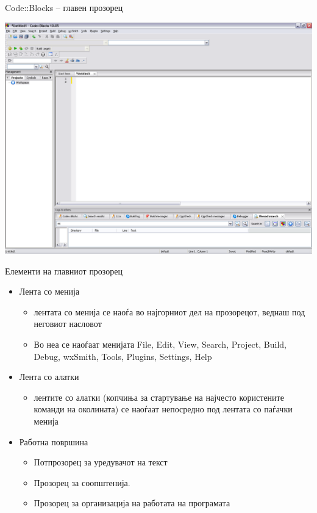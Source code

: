 \begin{frame}{Code::Blocks – главен прозорец}
\begin{center}
\includegraphics[scale=0.26]{images/cb_main}
\end{center}
\end{frame}

\begin{frame}{Елементи на главниот прозорец}
\begin{itemize}
  \item Лента со менија
    \begin{itemize}
      \item лентата со менија се наоѓа во најгорниот дел на прозорецот, веднаш под неговиот насловот 
      \item Во неа се наоѓаат менијата File, Edit, View, Search, Project, Build,
      Debug, wxSmith, Tools, Plugins, Settings, Help
    \end{itemize}
    \item Лента со алатки
    \begin{itemize}
      \item лентите со алатки (копчиња за стартување на најчесто користените
      команди на околината) се наоѓаат непосредно под лентата со паѓачки менија
    \end{itemize}
    \item Работна површина
    \begin{itemize}
      \item Потпрозорец за уредувачот на текст
      \item Прозорец за соопштенија.
      \item Прозорец за организација на работата на програмата
    \end{itemize}   
\end{itemize}
\end{frame}

